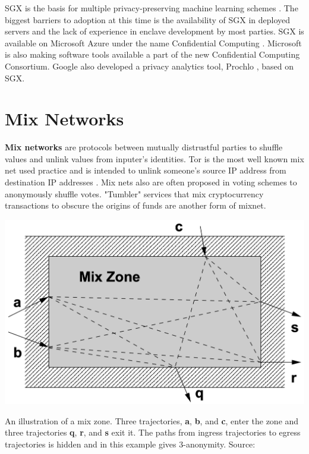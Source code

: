 \documentclass[nobib]{tufte-handout}
\begin{document}
SGX is the basis for multiple privacy-preserving machine learning schemes
\cite{DBLP:conf/eurosp/ChengZKHHJJ0S19,tramer2018slalom,DBLP:journals/corr/abs-1803-05961}.
The biggest barriers to adoption at this time is the availability of SGX in
deployed servers and the lack of experience in enclave development by most
parties. SGX is available on Microsoft Azure under the name Confidential
Computing \cite{azure-confidential-computing}.  Microsoft is also making
software tools available a part of the new Confidential Computing Consortium.
Google also developed a privacy analytics tool, Prochlo \cite{prochlo}, based on
SGX.

\section{Mix Networks}

\textbf{Mix networks} \cite{DBLP:journals/cacm/Chaum81} are protocols between
mutually distrustful parties to shuffle values and unlink values from inputer’s
identities. Tor is the most well known mix net used practice and is intended to
unlink someone's source IP address from destination IP addresses
\cite{DBLP:conf/uss/DingledineMS04}. Mix nets also are often proposed in voting
schemes to anonymously shuffle votes. "Tumbler" services that mix
cryptocurrency transactions to obscure the origins of funds are another form of
mixnet.


\begin{marginfigure} \includegraphics[width=\linewidth]{mixzone} \caption{
An illustration of a mix zone. Three trajectories, \textbf{a}, \textbf{b}, and
\textbf{c}, enter the zone and three trajectories \textbf{q}, \textbf{r}, and
\textbf{s} exit it. The paths from ingress trajectories to egress
trajectories is hidden and in this example gives 3-anonymity.
Source: \cite{freudiger2007mix}}
\label{fig:mixzone} \end{marginfigure}
\end{document}
